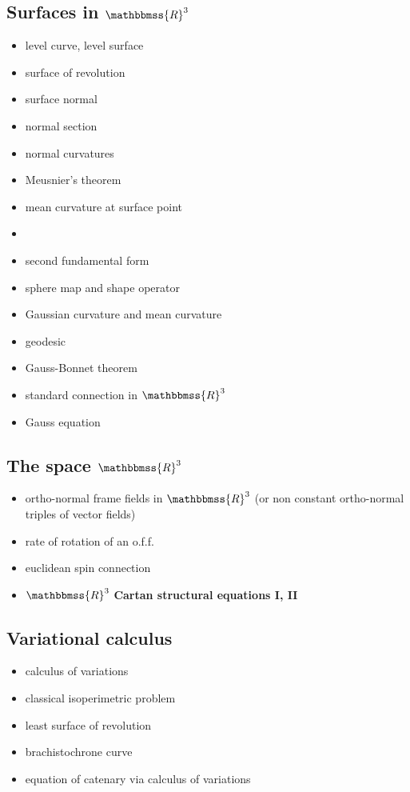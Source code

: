 \documentclass[12pt]{article}
\newcommand{\R}{\mathbbmss{R}}
\begin{document}
\subsection*{Surfaces in $\R^3$}
\begin{itemize}
\item level curve, level surface
\item surface of revolution
\item surface normal
\item normal section
\item normal curvatures
\item Meusnier's theorem
\item mean curvature at surface point
\item {}
\item second fundamental form
\item sphere map and shape operator
\item Gaussian curvature and mean curvature
\item geodesic
\item Gauss-Bonnet theorem
\item standard connection in $\R^3$
\item Gauss equation
\end{itemize}

\subsection*{The space $\R^3$}
\begin{itemize}
\item ortho-normal frame fields in $\R^3$ (or non constant ortho-normal triples of vector fields) 
\item rate of rotation of an o.f.f.
\item euclidean spin connection
\item $\R^3$ {\bf Cartan structural equations I, II}
\end{itemize}

\subsection*{Variational calculus}
\begin{itemize}
\item calculus of variations
\item classical isoperimetric problem
\item least surface of revolution
\item brachistochrone curve
\item equation of catenary via calculus of variations
\end{itemize}

\end{document}
